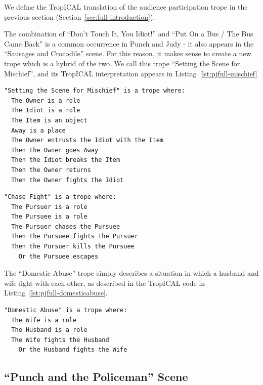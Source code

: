 \documentclass[11pt]{report}
\begin{document}
We define the TropICAL translation of the audience participation trope in the
previous section (Section~\ref{sec:full-introduction}).

The combination of ``Don't Touch It, You Idiot!'' and ``Put On a Bus / The Bus
Came Back'' is a common occurrence in Punch and Judy - it also appears in the
``Sausages and Crocodile'' scene. For this reason, it makes sense to create a new
trope which is a hybrid of the two. We call this trope ``Setting the Scene for
Mischief'', and its TropICAL interpretation appears in Listing~\ref{lst:pjfull-mischief}

\begin{lstlisting}[showstringspaces=false, label={lst:pjfull-mischief}, caption={The ``Setting the Scene
For Mischief'' trope}]
"Setting the Scene for Mischief" is a trope where:
  The Owner is a role
  The Idiot is a role
  The Item is an object
  Away is a place
  The Owner entrusts the Idiot with the Item
  Then the Owner goes Away
  Then the Idiot breaks the Item
  Then the Owner returns
  Then the Owner fights the Idiot
\end{lstlisting}

\begin{lstlisting}[showstringspaces=false, label={lst:pjfull-chasefight}, caption={The ``Chase
Fight'' trope}]
"Chase Fight" is a trope where:
  The Pursuer is a role
  The Pursuee is a role
  The Pursuer chases the Pursuee
  Then the Pursuee fights the Pursuer
  Then the Pursuer kills the Pursuee
    Or the Pursuee escapes
\end{lstlisting}

The ``Domestic Abuse'' trope simply describes a situation in which a husband and
wife fight with each other, as described in the TropICAL code in Listing~\ref{lst:pjfull-domesticabuse}.

\begin{lstlisting}[showstringspaces=false, label={lst:pjfull-domesticabuse}, caption={The ``Domestic
Abuse'' trope}]
"Domestic Abuse" is a trope where:
  The Wife is a role
  The Husband is a role
  The Wife fights the Husband
    Or the Husband fights the Wife
\end{lstlisting}

\subsection{``Punch and the Policeman'' Scene}
\end{document}
